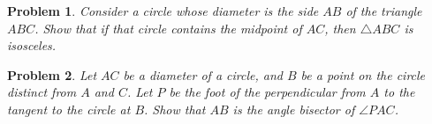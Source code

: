 \documentclass[a4paper,12pt]{article}
\theoremstyle{perfect}
\newtheorem{prb}{Problem}
\begin{document}
\begin{prb}
Consider a circle whose diameter is the side $AB$ of the triangle $ABC$. Show that if that circle contains the midpoint of $AC$, then $\triangle ABC$ is isosceles.
\end{prb}

\begin{prb}
Let $AC$ be a diameter of a circle, and $B$ be a point on the circle distinct from $A$ and $C$. Let $P$ be the foot of the perpendicular from $A$ to the tangent to the circle at $B$. Show that $AB$ is the angle bisector of $\angle PAC$. 
\end{prb}
\end{document}
